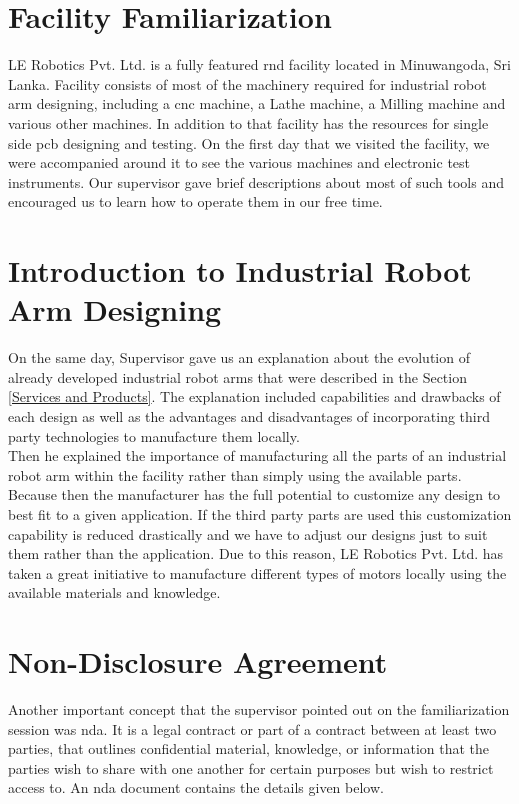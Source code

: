 \documentclass[a4paper,12pt]{report}%
\begin{document}
\section{Facility Familiarization}

LE Robotics Pvt. Ltd. is a fully featured \ac{rnd} facility located in Minuwangoda, Sri Lanka. Facility consists of most of the machinery required for industrial robot arm designing, including a \ac{cnc} machine, a Lathe machine, a Milling machine and various other machines. In addition to that facility has the resources for single side \ac{pcb} designing and testing. On the first day that we visited the facility, we were accompanied around it to see the various machines and electronic test instruments. Our supervisor gave brief descriptions about most of such tools and encouraged us to learn how to operate them in our free time.\\

\section{Introduction to Industrial Robot Arm Designing}

On the same day, Supervisor gave us an explanation about the evolution of already developed industrial robot arms that were described in the Section \ref{Services and Products}. The explanation included capabilities and drawbacks of each design as well as the advantages and disadvantages of incorporating third party technologies to manufacture them locally.\\

Then he explained the importance of manufacturing all the parts of an industrial robot arm within the facility rather than simply using the available parts. Because then the manufacturer has the full potential to customize any design to best fit to a given application. If the third party parts are used this customization capability is reduced drastically and we have to adjust our designs just to suit them rather than the application. Due to this reason, LE Robotics Pvt. Ltd. has taken a great initiative to manufacture different types of motors locally using the available materials and knowledge.

\section{Non-Disclosure Agreement}

Another important concept that the supervisor pointed out on the familiarization session was \ac{nda}. It is a legal contract or part of a
contract between at least two parties, that outlines confidential material, knowledge, or information that the parties wish to share with one another for certain purposes but wish to restrict access to\cite{nda}. An \ac{nda} document contains the details given below.
\end{document}
